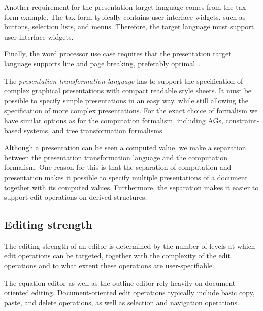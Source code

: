 Another requirement for the presentation target language comes from the tax form example. The tax form typically contains user interface widgets, such as buttons, selection lists, and menus. Therefore, the target language must support user interface widgets.


Finally, the word processor use case requires that the presentation target language supports line and page breaking, preferably optimal~\cite{knuth82breaking}. 

The {\em presentation transformation language} has to support the specification of complex graphical presentations with compact readable style sheets. It must be possible to specify simple presentations in an easy way, while still allowing the specification of more complex presentations. For the exact choice of formalism we have similar options as for the computation formalism, including AGs, constraint-based systems, and tree transformation formalisms.

Although a presentation can be seen a computed value, we make a separation between the presentation transformation language and the computation formalism. One reason for this is that the separation of computation and presentation makes it possible to specify multiple presentations of a document together with its computed values. Furthermore, the separation makes it easier to support edit operations on derived structures.


%																
\subsection{Editing strength}

The editing strength of an editor is determined by the number of levels at which edit operations can be targeted, together with the complexity of the edit operations and to what extent these operations are user-specifiable. 



The equation editor as well as the outline editor rely heavily on document-oriented editing. Document-oriented edit operations typically include basic copy, paste, and delete operations, as well as selection and navigation operations.


